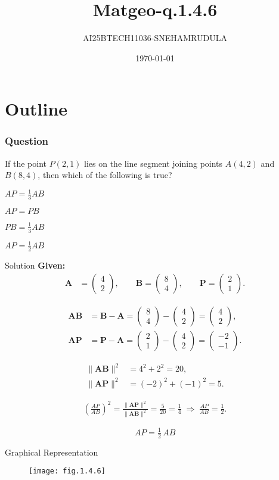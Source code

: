 \documentclass{beamer}
\title{Matgeo-q.1.4.6}
\author{AI25BTECH11036-SNEHAMRUDULA}
\date{\today}
\theoremstyle{remark}
\newcommand{\myvec}[1]{\ensuremath{\begin{pmatrix}#1\end{pmatrix}}}
\let\vec\mathbf
\begin{document}
\begin{frame}
\titlepage
\end{frame}

\section*{Outline}


\begin{frame}
\frametitle{Question}
\item If the point $P(2, 1)$ lies on the line segment joining points $A(4, 2)$ and $B(8, 4)$, then which of the following is true?
    \item $AP = \frac{1}{3} AB$
    \item $AP = PB$
    \item $PB = \frac{1}{3} AB$
    \item $AP = \frac{1}{2} AB$

\end{frame}
%
\begin{frame}[t]{Solution}
\small
\textbf{Given:}\;
\begin{align}
\vec{A} &= \myvec{4\\2},\qquad
\vec{B} = \myvec{8\\4},\qquad
\vec{P} = \myvec{2\\1}.
\end{align}

\begin{align}
\vec{AB} &= \vec{B}-\vec{A}
= \myvec{8\\4}-\myvec{4\\2}
= \myvec{4\\2},\\[2mm]
\vec{AP} &= \vec{P}-\vec{A}
= \myvec{2\\1}-\myvec{4\\2}
= \myvec{-2\\-1}.
\end{align}

\begin{align}
\|\vec{AB}\|^2 &= 4^2 + 2^2 = 20,\\[1mm]
\|\vec{AP}\|^2 &= (-2)^2 + (-1)^2 = 5.
\end{align}

\begin{align}
\left(\frac{AP}{AB}\right)^2
= \frac{\|\vec{AP}\|^2}{\|\vec{AB}\|^2}
= \frac{5}{20}
= \frac{1}{4}
\;\Rightarrow\;
\frac{AP}{AB} = \frac{1}{2}.
\end{align}

\[
\boxed{\,AP=\tfrac{1}{2}\,AB\,}
\]
\end{frame}
    \begin{frame}{Graphical Representation}
   \begin{figure}[h!]
\centering
\texttt{[image: fig.1.4.6]}

\end{figure}
\end{frame}
\end{document}
